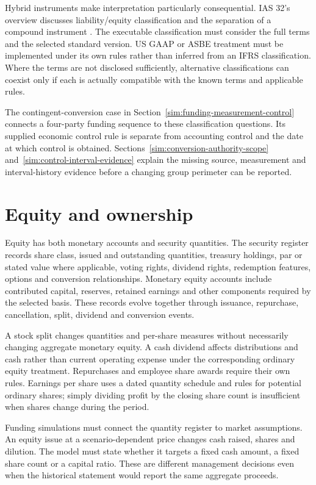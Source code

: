 Hybrid instruments make interpretation particularly consequential. IAS 32's
overview discusses liability/equity classification and the separation of a
compound instrument \citep{ias32}. The executable classification must consider
the full terms and the selected standard version. US GAAP or ASBE treatment
must be implemented under its own rules rather than inferred from an IFRS
classification. Where the terms are not disclosed sufficiently, alternative
classifications can coexist only if each is actually compatible with the
known terms and applicable rules.


The contingent-conversion case in Section~\ref{sim:funding-measurement-control}
connects a four-party funding sequence to these classification questions.
Its supplied economic control rule is separate from accounting control and
the date at which control is obtained. Sections~\ref{sim:conversion-authority-scope}
and~\ref{sim:control-interval-evidence} explain the missing source, measurement
and interval-history evidence before a changing group perimeter can be reported.



\section{Equity and ownership}

Equity has both monetary accounts and security quantities. The security
register records share class, issued and outstanding quantities, treasury
holdings, par or stated value where applicable, voting rights, dividend rights,
redemption features, options and conversion relationships. Monetary equity
accounts include contributed capital, reserves, retained earnings and other
components required by the selected basis. These records evolve together
through issuance, repurchase, cancellation, split, dividend and conversion
events.

A stock split changes quantities and per-share measures without necessarily
changing aggregate monetary equity. A cash dividend affects distributions and
cash rather than current operating expense under the corresponding ordinary
equity treatment. Repurchases and employee share awards require their own
rules. Earnings per share uses a dated quantity schedule and rules for potential
ordinary shares; simply dividing profit by the closing share count is
insufficient when shares change during the period.

Funding simulations must connect the quantity register to market assumptions.
An equity issue at a scenario-dependent price changes cash raised, shares and
dilution. The model must state whether it targets a fixed cash amount, a fixed
share count or a capital ratio. These are different management decisions even
when the historical statement would report the same aggregate proceeds.

